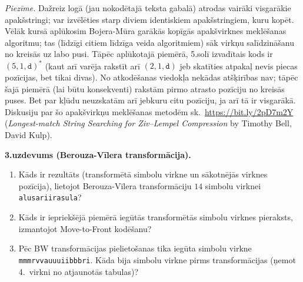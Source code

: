 \documentclass[a4paper,12pt]{article}
\begin{document}
{{\em Piezīme.} Dažreiz logā (jau nokodētajā teksta gabalā) atrodas vairāki visgarākie
apakšstringi; var izvēlēties starp diviem identiskiem apakšstringiem, kuru kopēt. 
Vēlāk kursā aplūkosim Bojera-Mūra garākās kopīgās apakšvirknes meklēšanas algoritmu; tas (līdzīgi 
citiem līdzīga veida algoritmiem) sāk virkņu salīdzināšanu no kreisās uz labo pusi. 
Tāpēc aplūkotajā piemērā, 5.solī izvadītais kods ir $(5,1,\mathtt{d})^{\ast}$
(kaut arī varēja rakstīt arī $(2,1,\mathtt{d})$ jeb skatīties atpakaļ nevis piecas pozīcijas, bet tikai divas). 
No atkodēšanas viedokļa nekādas atšķirības nav; tāpēc šajā piemērā (lai būtu konsekventi) rakstām 
pirmo atrasto pozīciju no kreisās puses. Bet par kļūdu neuzskatām arī jebkuru citu pozīciju, ja 
arī tā ir visgarākā. Diskusiju par šo apakšvirkņu meklēšanas metodēm sk.\ 
\url{https://bit.ly/2pD7m2Y} ({\em Longest-match String Searching for Ziv–Lempel Compression} by 
Timothy Bell, David Kulp). 


}



{\bf 3.uzdevums (Berouza-Vīlera transformācija).}

\begin{enumerate}[label=(\alph*)]
\item 
Kāds ir rezultāts (transformētā simbolu virkne un sākotnējās virknes pozīcija), 
lietojot Berouza-Vīlera transformāciju 
$14$ simbolu virknei {\tt alusariirasula}?
\item Kāds ir iepriekšējā piemērā iegūtās transformētās simbolu virknes pieraksts,
izmantojot Move-to-Front kodēšanu?
\item Pēc BW transformācijas pielietošanas tika iegūta simbolu virkne 
{\tt mmmrvvauuuiibbbri}. Kāda bija simbolu virkne pirms 
transformācijas (ņemot 4.\ virkni
no atjaunotās tabulas)?
\end{enumerate}
\end{document}

